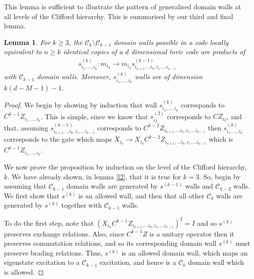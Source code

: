\documentclass[pra,twocolumn,a4paper,nofootinbib]{revtex4-1}
\newtheorem{lem}{Lemma}
\begin{document}
This lemma is sufficient to illustrate the pattern of generalised domain walls at all levels of the Clifford hierarchy. This is summarised by our third and final lemma.
\begin{lem}\label{l3}
For $k \geq 3$, the $\mathcal{C}_k \setminus \mathcal{C}_{k-1}$ domain walls possible in a code locally equivalent to $n \geq k$ identical copies of a $d$ dimensional toric code are products of
\begin{align}
s_{i_1, \ldots , i_k}^{(k)}: m_{i_a} \to m_{i_a} s^{(k-1)}_{i_{a+1}, \ldots i_k, i_1, \ldots i_{a-1}}
\end{align}
with $\mathcal{C}_{k-1}$ domain walls. Moreover, $s_{i_1, \ldots , i_k}^{(k)}$ walls are of dimension $k(d-M-1)-1$.
\end{lem}
\begin{proof}
We begin by showing by induction that wall $s_{i_1, \ldots , i_k}^{(k)}$ corresponds to $C^{k-1}Z_{i_1, \ldots , i_k}$. This is simple, since we know that $s^{(2)}_{ij}$ corresponds to $CZ_{ij}$, and that, assuming $s^{(k-1)}_{i_{a+1}, \ldots i_k, i_1, \ldots i_{a-1}}$ corresponds to $C^{k-2}Z_{i_{a+1}, \ldots i_k, i_1, \ldots i_{a-1}}$ then $s_{i_1, \ldots , i_k}^{(k)}$ corresponds to the gate which maps $\bar{X}_{i_a} \to {X}_{i_a}C^{k-2}Z_{i_{a+1}, \ldots i_k, i_1, \ldots i_{a-1}}$ which is $C^{k-1}Z_{i_1, \ldots , i_k}$.

We now prove the proposition by induction on the level of the Clifford hierarchy, $k$. We have already shown, in lemma \ref{l2}, that it is true for $k=3$. So, begin by assuming that $\mathcal{C}_{k-1}$ domain walls are generated by $s^{(k-1)}$ walls and $\mathcal{C}_{k-2}$ walls. We first show that $s^{(k)}$ is an allowed wall, and then that all other $\mathcal{C}_k$ walls are generated by $s^{(k)}$ together with $\mathcal{C}_{k-1}$ walls.

To do the first step, note that $\left({X}_{i_a}C^{k-1}Z_{i_{a+1}, \ldots i_k, i_1, \ldots i_{a-1}}\right)^2=I$ and so $s^{(k)}$ preserves exchange relations. Also, since $C^{k-1}Z$ is a unitary operator then it preserves commutation relations, and so its corresponding domain wall $s^{(k)}$ must preserve brading relations. Thus, $s^{(k)}$ is an allowed domain wall, which maps an eigenstate excitation to a $\mathcal{C}_{k-1}$ excitation, and hence is a $\mathcal{C}_k$ domain wall which is allowed.


\end{proof}
\end{document}
